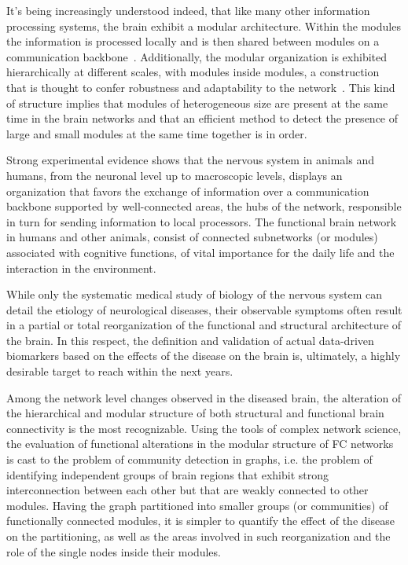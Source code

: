 It's being increasingly understood indeed, that like many other information processing systems, the brain exhibit a modular architecture.
Within the modules the information is processed locally and is then shared between modules on a communication backbone~\cite{dereus2013a,vandenheuvel2013a}.
Additionally, the modular organization is exhibited hierarchically at different scales, with modules inside modules, a construction that is thought to confer robustness and adaptability to the network~\cite{meunier2010}. This kind of structure implies that modules of heterogeneous size are present at the same time in the brain networks and that an efficient method to detect the presence of large and small modules at the same time together is in order.

Strong experimental evidence shows that the nervous system in animals and humans, from the neuronal level up to macroscopic levels, displays an organization that favors the exchange of information over a communication backbone supported by well-connected areas, the hubs of the network, responsible in turn for sending information to local processors. The functional brain network in humans and other animals, consist of connected subnetworks (or modules) associated with cognitive functions, of vital importance for the daily life and the interaction in the environment.

While only the systematic medical study of biology of the nervous system can detail the etiology of neurological diseases, their observable symptoms often result in a partial or total reorganization of the functional and structural architecture of the brain. In this respect, the definition and validation of actual data-driven biomarkers based on the effects of the disease on the brain is, ultimately, a highly desirable target to reach within the next years.

Among the network level changes observed in the diseased brain, the alteration of the hierarchical and modular structure of both structural and functional brain connectivity is the most recognizable. Using the tools of complex network science, the evaluation of functional alterations in the modular structure of FC networks is cast to the problem of community detection in graphs, i.e. the problem of identifying independent groups of brain regions that exhibit strong interconnection between each other but that are weakly connected to other modules.
Having the graph partitioned into smaller groups (or communities) of functionally connected modules, it is simpler to quantify the effect of the disease on the partitioning, as well as the areas involved in such reorganization and the role of the single nodes inside their modules.


